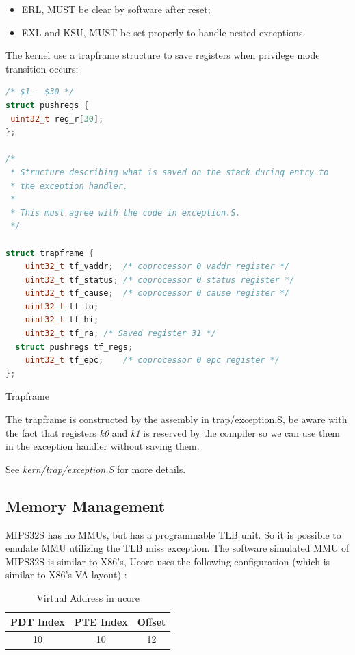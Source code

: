 \documentclass[a4paper]{article}
\begin{document}
\begin{itemize}
\item ERL, MUST be clear by software after reset;
\item EXL and KSU, MUST be set properly to handle nested exceptions.
\end{itemize}

The kernel use a trapframe structure to save registers when privilege mode transition occurs:
\begin{algorithm}[h]
   \begin{lstlisting}[language={C++}]
/* $1 - $30 */
struct pushregs {
 uint32_t reg_r[30];
};

/*
 * Structure describing what is saved on the stack during entry to
 * the exception handler.
 *
 * This must agree with the code in exception.S.
 */

struct trapframe {
	uint32_t tf_vaddr;	/* coprocessor 0 vaddr register */
	uint32_t tf_status;	/* coprocessor 0 status register */
	uint32_t tf_cause;	/* coprocessor 0 cause register */
	uint32_t tf_lo;
	uint32_t tf_hi;
	uint32_t tf_ra;	/* Saved register 31 */
  struct pushregs tf_regs;
	uint32_t tf_epc;	/* coprocessor 0 epc register */
};

\end{lstlisting}
\caption{Trapframe}
\end{algorithm}

The trapframe is constructed by the assembly in trap/exception.S, be aware with the fact that
registers \emph{k0} and \emph{k1} is reserved by the compiler so we can use them in the exception
handler without saving them.

See \emph{kern/trap/exception.S} for more details.

\subsection{Memory Management}
\label{sec:mm}
MIPS32S has no MMUs, but has a programmable TLB unit. So
it is possible to emulate MMU utilizing the TLB miss exception.
The software simulated MMU of MIPS32S is similar to X86's, 
Ucore uses the following 
configuration (which is similar to X86's VA layout) :

\begin{table}[H]
\centering
\begin{tabular}{|c|c|c|}
\hline
PDT Index & PTE Index & Offset \\
\hline
10 & 10 & 12 \\
\hline
\end{tabular}
\caption{Virtual Address in ucore}
\label{tab:va_layout}
\end{table}
\end{document}

